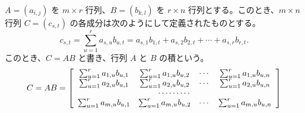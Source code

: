 \begin{definition}
$A = (a_{i,j})$ を $m\times r$  行列、$B = (b_{k,l})$ を $r\times n$ 行列とする。このとき、$m\times n$ 行列 $C = (c_{s,t})$ の各成分は次のようにして定義されたものとする。
$$c_{s,t} = \sum_{u = 1}^r a_{s,u}b_{u,t} = a_{s,1}b_{1,t} + a_{s,2}b_{2,t} + \cdots + a_{s,r}b_{r,t}.$$
このとき、$C = AB$ と書き、{\gt 行列 $A$ と $B$ の積}という。
$$C = AB = \left[\begin{array}{cccc}
\sum_{u = 1}^ra_{1,u}b_{u,1} & \sum_{u = 1}^ra_{1,u}b_{u,2} & \cdots & \sum_{u = 1}^ra_{1,u}b_{u,n}\\
\sum_{u = 1}^ra_{2,u}b_{u,1} & \sum_{u = 1}^ra_{2,u}b_{u,2} & \cdots & \sum_{u = 1}^ra_{2,u}b_{u,n}\\
\multicolumn{4}{c}{\cdots\cdots\cdots}\\
\sum_{u = 1}^ra_{m,u}b_{u,1} & \sum_{u = 1}^ra_{m,u}b_{u,2} & \cdots & \sum_{u = 1}^ra_{m,u}b_{u,n}
\end{array}
\right]$$
\end{definition}

